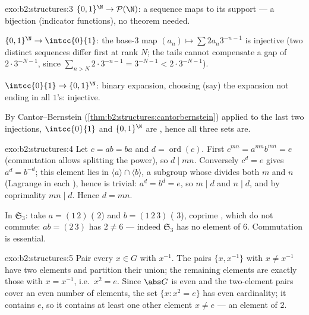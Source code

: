 \begin{solution}{exo:b2:structures:3}
$\{0,1\}^{\N} \to \mathcal{P}(\N)$: a sequence maps to its support
--- a bijection (indicator functions), no theorem needed.

$\{0,1\}^{\N} \to \intcc{0}{1}$: the base-$3$ map $(a_n) \mapsto
\sum 2a_n 3^{-n-1}$ is injective (two distinct sequences differ
first at rank $N$; the tails cannot compensate a gap of $2\cdot
3^{-N-1}$, since $\sum_{n > N} 2\cdot 3^{-n-1} = 3^{-N-1} <
2\cdot3^{-N-1}$).

$\intcc{0}{1} \to \{0,1\}^{\N}$: binary expansion, choosing (say)
the expansion not ending in all $1$'s: injective.

By Cantor--Bernstein (\cref{thm:b2:structures:cantorbernstein})
applied to the last two injections, $\intcc{0}{1}$ and
$\{0,1\}^{\N}$ are , hence all three sets are.
\end{solution}

\begin{solution}{exo:b2:structures:4}
Let $c = ab = ba$ and $d = \operatorname{ord}(c)$. First $c^{mn} =
a^{mn} b^{mn} = e$ (commutation allows splitting the power), so $d
\mid mn$. Conversely $c^d = e$ gives $a^d = b^{-d}$; this element
lies in $\langle a\rangle \cap \langle b\rangle$, a subgroup whose
 divides both $m$ and $n$ (Lagrange in each ),
hence is trivial: $a^d = b^d = e$, so $m \mid d$ and $n \mid d$, and
by coprimality $mn \mid d$. Hence $d = mn$.

In $\mathfrak{S}_3$: take $a = (1\,2)$ ( $2$) and $b =
(1\,2\,3)$ ( $3$), coprime , which do not commute: $ab =
(2\,3)$ has  $2 \neq 6$ --- indeed $\mathfrak{S}_3$ has no
element of  $6$. Commutation is essential.
\end{solution}

\begin{solution}{exo:b2:structures:5}
Pair every $x \in G$ with $x^{-1}$. The pairs $\{x, x^{-1}\}$ with
$x \neq x^{-1}$ have two elements and partition their union; the
remaining elements are exactly those with $x = x^{-1}$, i.e.\ $x^2 =
e$. Since $\abs G$ is even and the two-element pairs cover an even
number of elements, the set $\{x : x^2 = e\}$ has even cardinality;
it contains $e$, so it contains at least one other element $x \neq
e$ --- an element of  $2$.
\end{solution}

